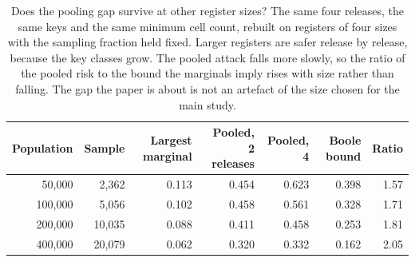 \begin{table}[t]
\centering
\caption{Does the pooling gap survive at other register sizes? The same four releases, the same keys and the same minimum cell count, rebuilt on registers of four sizes with the sampling fraction held fixed. Larger registers are safer release by release, because the key classes grow. The pooled attack falls more slowly, so the ratio of the pooled risk to the bound the marginals imply rises with size rather than falling. The gap the paper is about is not an artefact of the size chosen for the main study.}
\label{tab:scaling}
\small
\begin{tabular}{rrrrrrr}
\toprule
Population & Sample & Largest marginal & Pooled, 2 releases & Pooled, 4 & Boole bound & Ratio \\
\midrule
50{,}000 & 2{,}362 & 0.113 & 0.454 & 0.623 & 0.398 & 1.57 \\
100{,}000 & 5{,}056 & 0.102 & 0.458 & 0.561 & 0.328 & 1.71 \\
200{,}000 & 10{,}035 & 0.088 & 0.411 & 0.458 & 0.253 & 1.81 \\
400{,}000 & 20{,}079 & 0.062 & 0.320 & 0.332 & 0.162 & 2.05 \\
\bottomrule
\end{tabular}
\end{table}
